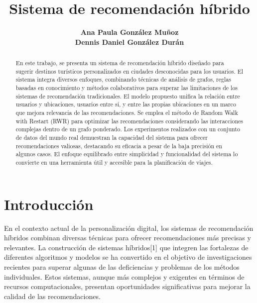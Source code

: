 \documentclass[runningheads]{llncs}
\begin{document}
%
\title{Sistema de recomendación híbrido}
%

\author{
    \textbf{Ana Paula González Muñoz}\\
    \textbf{Dennis Daniel González Durán}
    }

%
\maketitle            
%
\begin{abstract}
    
 En este trabajo, se presenta un sistema de recomendación híbrido diseñado para sugerir destinos turísticos personalizados en ciudades desconocidas para los usuarios. El sistema integra diversos enfoques, combinando técnicas de análisis de grafos, reglas basadas en conocimiento y métodos colaborativos para superar las limitaciones de los sistemas de recomendación tradicionales. El modelo propuesto unifica la relación entre usuarios y ubicaciones, usuarios entre sí, y entre las propias ubicaciones en un marco que mejora relevancia de las recomendaciones. Se emplea el método de Random Walk with Restart (RWR) para optimizar las recomendaciones considerando las interacciones complejas dentro de un grafo ponderado. Los experimentos realizados con un conjunto de datos del mundo real demuestran la capacidad del sistema para ofrecer recomendaciones valiosas, destacando su eficacia a pesar de la baja precisión en algunos casos. El enfoque equilibrado entre simplicidad y funcionalidad del sistema lo convierte en una herramienta útil y accesible para la planificación de viajes.

\end{abstract}

%

\section{Introducción}

En el contexto actual de la personalización digital, los sistemas de recomendación híbridos combinan diversas técnicas para ofrecer recomendaciones más precisas y relevantes. La construcción de sistemas híbridos[1] que integren las fortalezas de diferentes algoritmos y modelos se ha convertido en el objetivo de investigaciones recientes para superar algunas de las deficiencias y problemas de los métodos individuales. Estos sistemas, aunque más complejos y exigentes en términos de recursos computacionales, presentan oportunidades significativas para mejorar la calidad de las recomendaciones.
\end{document}
